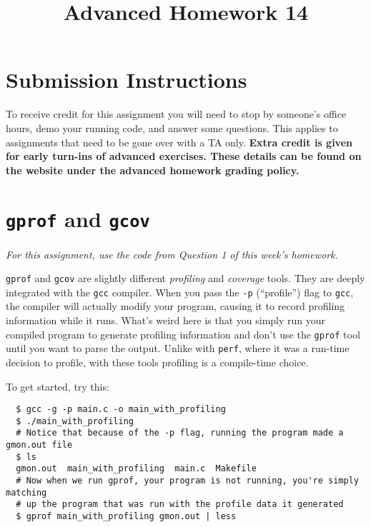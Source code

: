 \documentclass{article}
\begin{document}
\fancyfoot[C]{\color{gray} \thepage~/~\pageref*{LastPage}}
\pagestyle{fancyplain}

\title{\textbf{Advanced Homework 14\\}}
\author{\textbf{\color{red}{Due: Wednesday, April 18th, 11:59PM (Hard Deadline)}}}
\date{}
\maketitle


\section*{Submission Instructions}
To receive credit for this assignment you will need to stop by someone's
office hours, demo your running code, and answer some questions. \textbf{\color{red}{Make sure
to check the office hour schedule as the real due date is at the last office
hours before the date listed above.}} This applies to assignments that need to be gone over with a TA only.
\textbf{Extra credit is given for early turn-ins of advanced exercises. These details can be found on the website under the advanced homework grading policy.}


\section*{\texttt{gprof} and \texttt{gcov}}

\emph{For this assignment, use the code from Question 1 of this week's
  homework.}

\texttt{gprof} and \texttt{gcov} are slightly different \emph{profiling} and
\emph{coverage} tools. They are deeply integrated with the \texttt{gcc}
compiler. When you pass the \texttt{-p} (``profile'') flag to \texttt{gcc},
the compiler will actually modify your program, causing it to record profiling
information while it runs. What's weird here is that you simply run your
compiled program to generate profiling information and don't use the
\texttt{gprof} tool until you want to parse the output. Unlike with
\texttt{perf}, where it was a run-time decision to profile, with these tools
profiling is a compile-time choice.

To get started, try this:
\begin{verbatim}
  $ gcc -g -p main.c -o main_with_profiling
  $ ./main_with_profiling
  # Notice that because of the -p flag, running the program made a gmon.out file
  $ ls
  gmon.out  main_with_profiling  main.c  Makefile
  # Now when we run gprof, your program is not running, you're simply matching
  # up the program that was run with the profile data it generated
  $ gprof main_with_profiling gmon.out | less
\end{verbatim}
\end{document}
